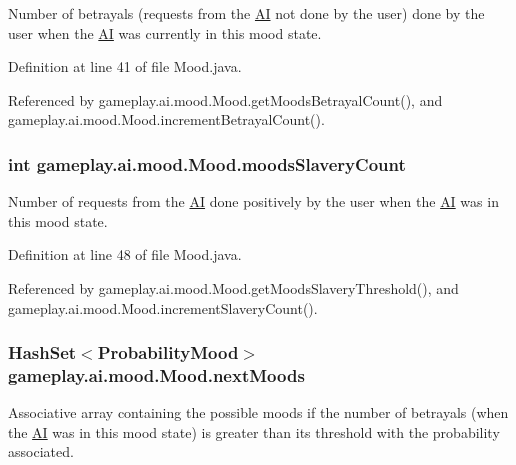 Number of betrayals (requests from the \hyperlink{a00001}{A\-I} not done by the user) done by the user when the \hyperlink{a00001}{A\-I} was currently in this mood state. 



Definition at line 41 of file Mood.\-java.



Referenced by gameplay.\-ai.\-mood.\-Mood.\-get\-Moods\-Betrayal\-Count(), and gameplay.\-ai.\-mood.\-Mood.\-increment\-Betrayal\-Count().

\hypertarget{a00015_a0bfc4bebdf6767b8c32e747ec21da39e}{
\subsubsection[{moods\-Slavery\-Count}]{\setlength{\rightskip}{0pt plus 5cm}int gameplay.\-ai.\-mood.\-Mood.\-moods\-Slavery\-Count\hspace{0.3cm}{\ttfamily [protected]}}}\label{a00015_a0bfc4bebdf6767b8c32e747ec21da39e}


Number of requests from the \hyperlink{a00001}{A\-I} done positively by the user when the \hyperlink{a00001}{A\-I} was in this mood state. 



Definition at line 48 of file Mood.\-java.



Referenced by gameplay.\-ai.\-mood.\-Mood.\-get\-Moods\-Slavery\-Threshold(), and gameplay.\-ai.\-mood.\-Mood.\-increment\-Slavery\-Count().

\hypertarget{a00015_af19cdc9b24293b9d7898d66720b8e0e7}{
\subsubsection[{next\-Moods}]{\setlength{\rightskip}{0pt plus 5cm}Hash\-Set$<${\bf Probability\-Mood}$>$ gameplay.\-ai.\-mood.\-Mood.\-next\-Moods\hspace{0.3cm}{\ttfamily [protected]}}}\label{a00015_af19cdc9b24293b9d7898d66720b8e0e7}


Associative array containing the possible moods if the number of betrayals (when the \hyperlink{a00001}{A\-I} was in this mood state) is greater than its threshold with the probability associated. 



